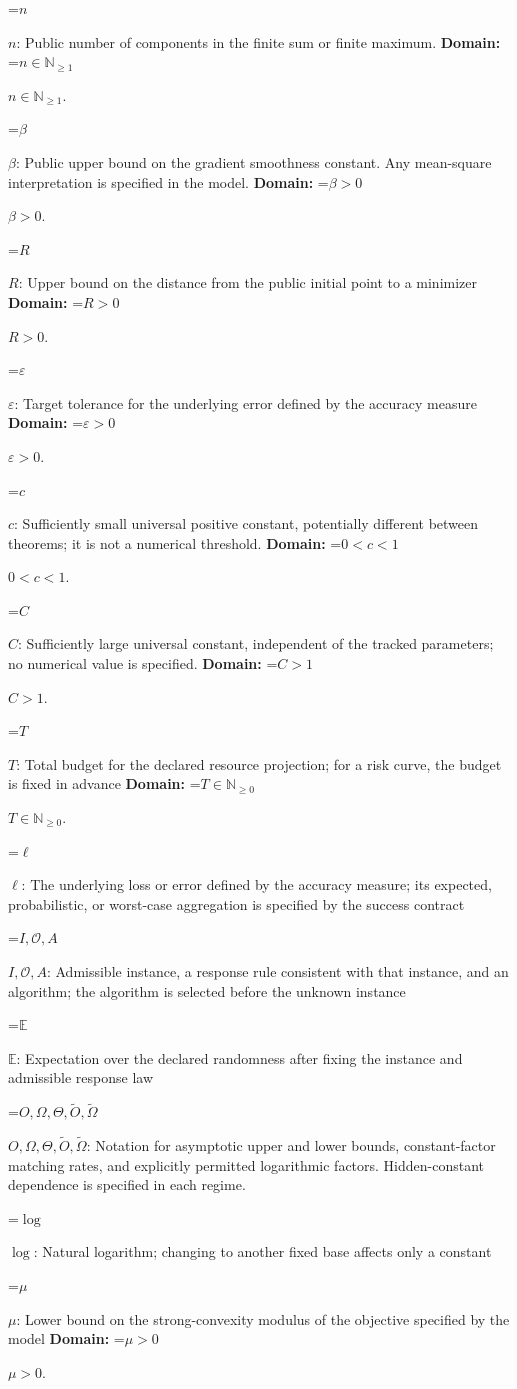 \documentclass[10pt,a4paper]{article}
\newcommand{\AtlasMath}[1]{\par\begingroup\centering\setbox0=\hbox{$\displaystyle #1$}\ifdim\wd0>1.4\linewidth\typeout{ATLAS WIDE FORMULA: \the\wd0}\fi\ifdim\wd0>\linewidth\resizebox{\linewidth}{!}{\box0}\else\box0\fi\par\endgroup}
\newcommand{\AtlasInlineMath}[1]{\begingroup\setbox0=\hbox{$#1$}\ifdim\wd0>.4\linewidth\endgroup\AtlasMath{#1}\else\endgroup$#1$\fi}
\begin{document}
\AtlasInlineMath{n}: Public number of components in the finite sum or finite maximum. \textbf{Domain:} \AtlasInlineMath{n\in\mathbb{N}_{\ge1}}.

\AtlasInlineMath{\beta}: Public upper bound on the gradient smoothness constant. Any mean-square interpretation is specified in the model. \textbf{Domain:} \AtlasInlineMath{\beta>0}.

\AtlasInlineMath{R}: Upper bound on the distance from the public initial point to a minimizer \textbf{Domain:} \AtlasInlineMath{R>0}.

\AtlasInlineMath{\varepsilon}: Target tolerance for the underlying error defined by the accuracy measure \textbf{Domain:} \AtlasInlineMath{\varepsilon>0}.

\AtlasInlineMath{c}: Sufficiently small universal positive constant, potentially different between theorems; it is not a numerical threshold. \textbf{Domain:} \AtlasInlineMath{0<c<1}.

\AtlasInlineMath{C}: Sufficiently large universal constant, independent of the tracked parameters; no numerical value is specified. \textbf{Domain:} \AtlasInlineMath{C>1}.

\AtlasInlineMath{T}: Total budget for the declared resource projection; for a risk curve, the budget is fixed in advance \textbf{Domain:} \AtlasInlineMath{T\in\mathbb{N}_{\ge0}}.

\AtlasInlineMath{\ell}: The underlying loss or error defined by the accuracy measure; its expected, probabilistic, or worst-case aggregation is specified by the success contract

\AtlasInlineMath{I,\mathcal{O},A}: Admissible instance, a response rule consistent with that instance, and an algorithm; the algorithm is selected before the unknown instance

\AtlasInlineMath{\mathbb{E}}: Expectation over the declared randomness after fixing the instance and admissible response law

\AtlasInlineMath{O,\Omega,\Theta,\widetilde{O},\widetilde\Omega}: Notation for asymptotic upper and lower bounds, constant-factor matching rates, and explicitly permitted logarithmic factors. Hidden-constant dependence is specified in each regime.

\AtlasInlineMath{\log}: Natural logarithm; changing to another fixed base affects only a constant

\AtlasInlineMath{\mu}: Lower bound on the strong-convexity modulus of the objective specified by the model \textbf{Domain:} \AtlasInlineMath{\mu>0}.
\end{document}
